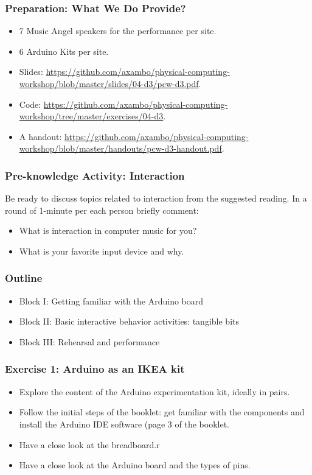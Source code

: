 \documentclass[screen, aspectratio=43]{beamer}
\begin{document}
%
\begin{frame}
  \frametitle{Preparation: What We Do Provide?}
        \begin{itemize}
        \item 7 Music Angel speakers for the performance per site.
        \item 6 Arduino Kits per site.
        \item Slides: \url{https://github.com/axambo/physical-computing-workshop/blob/master/slides/04-d3/pcw-d3.pdf}.
        \item Code: \url{https://github.com/axambo/physical-computing-workshop/tree/master/exercises/04-d3}.
        \item A handout: \url{https://github.com/axambo/physical-computing-workshop/blob/master/handouts/pcw-d3-handout.pdf}.        
         \end{itemize}
\end{frame}
%
\begin{frame}
  \frametitle{Pre-knowledge Activity: Interaction}
  Be ready to discuss topics related to interaction from the suggested reading. In a round of 1-minute per each person briefly comment:
  \begin{itemize}
  \item What is interaction in computer music for you?
  \item What is your favorite input device and why.
  \end{itemize}
\end{frame}
%
\begin{frame}
  \frametitle{Outline}
      \begin{itemize}
	\item Block I: Getting familiar with the Arduino board
	\item Block II: Basic interactive behavior activities: tangible bits
	\item Block III: Rehearsal and performance
    \end{itemize}  
\end{frame}
%
\begin{frame}
  \frametitle{Exercise 1: Arduino as an IKEA kit}
    \begin{itemize}
    	\item Explore the content of the Arduino experimentation kit, ideally in pairs.
	\item Follow the initial steps of the booklet: get familiar with the components and install the Arduino IDE software (page 3 of the booklet.
	\item Have a close look at the breadboard.r
	\item Have a close look at the Arduino board and the types of pins.
    \end{itemize}
\end{frame}
\end{document}
